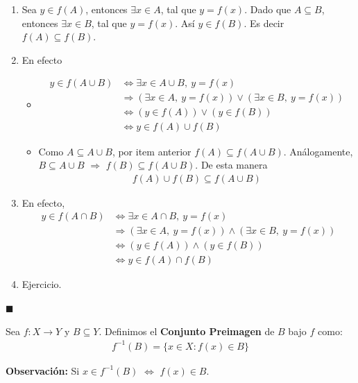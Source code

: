 \documentclass[12pt]{book}
\renewenvironment{proof}[1][\textit{Demostración}]{%
  \par\noindent{\bfseries #1.}\enspace}{\hfill$\blacksquare$\par}
\begin{document}
\begin{proof}
    \begin{enumerate}
        \item Sea $y \in f(A)$, entonces $\exists x \in A$, tal que  $y=f(x)$. Dado que $A \subseteq B$, entonces $\exists x \in B$, tal que  $y=f(x)$. Así $y \in f(B)$. Es decir $f(A) \subseteq f(B)$.

        \item En efecto
\begin{itemize}
    \item[$(\subseteq)$] 
    \begin{align*}
y \in f(A \cup B) &\Longleftrightarrow \exists x \in A \cup B, \ y=f(x) \\
&\Longrightarrow (\exists x \in A, \ y=f(x)) \vee ( \exists x \in B, \ y =f(x))  \\
&\Longleftrightarrow ( y \in f(A)) \vee ( y \in f(B)) \\
&\Longleftrightarrow y \in f(A) \cup f(B)
    \end{align*}

    \item[$(\supseteq)$]

    Como $A \subseteq A \cup B$, por item anterior $f(A) \subseteq f(A \cup B)$. Análogamente, $B \subseteq A \cup B$ $\Longrightarrow$ $f(B) \subseteq f(A \cup B)$. De esta manera 
    \begin{align*}
        f(A) \cup f(B) \subseteq f(A \cup B)
    \end{align*}
\end{itemize}

        \item En efecto,
        \begin{align*}
            y \in f(A \cap B) &\Longleftrightarrow \exists x \in A \cap B, \ y =f(x) \\
           &\Longrightarrow (\exists x \in A , \ y =f(x)  ) \wedge ( \exists x \in B, \ y=f(x) ) \\
           &\Longleftrightarrow (y \in f(A) ) \wedge (y \in f(B)) \\
           &\Longleftrightarrow y \in f(A) \cap f(B)
        \end{align*}
        \item Ejercicio.
    \end{enumerate}
\end{proof}

\begin{defi}{}{}
    Sea $f : X \longrightarrow Y$ y $B \subseteq Y$. Definimos el \textbf{Conjunto Preimagen} de $B$ bajo $f$ como:
    \begin{align*}
        f^{-1}(B)=\{ x \in X : f(x) \in B \}
    \end{align*}
\end{defi}
\textbf{Observación:} Si $x \in f^{-1}(B)$ $\Longleftrightarrow$ $ f(x) \in B$.
\end{document}
